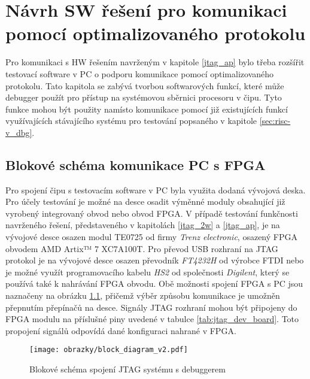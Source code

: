 \chapter{Návrh SW řešení pro komunikaci pomocí optimalizovaného protokolu}	\label{sw}
Pro komunikaci s HW řešením navrženým v kapitole \ref{jtag_ap} bylo třeba rozšířit testovací software v PC o podporu komunikace pomocí optimalizovaného protokolu. Tato kapitola se zabývá tvorbou softwarových funkcí, které může debugger použít pro přístup na systémovou sběrnici procesoru v čipu. Tyto funkce mohou být použity namísto komunikace pomocí již existujících funkcí využívajících stávajícího systému pro testování popsaného v kapitole \ref{sec:risc-v_dbg}.


\section{Blokové schéma komunikace PC s \acs{FPGA}}
Pro spojení čipu s testovacím software v PC byla využita dodaná vývojová deska. Pro účely testování je možné na desce osadit výměnné moduly obsahující již vyrobený integrovaný obvod nebo obvod \acs{FPGA}. V případě testování funkčnosti navrženého řešení, představeného v kapitolách \ref{jtag_2w} a \ref{jtag_ap}, je na vývojové desce osazen modul TE0725 od firmy \textit{Trenz electronic}, osazený FPGA obvodem AMD Artix™ 7 XC7A100T. Pro převod USB rozhraní na \acs{JTAG} protokol je na vývojové desce osazen převodník \textit{FT4232H} od výrobce FTDI nebo je možné využít programovacího kabelu \textit{HS2} od společnosti \textit{Digilent}, který se používá také k nahrávání \acs{FPGA} obvodu. Obě možnosti spojení \acs{FPGA} s PC jsou naznačeny na obrázku \ref{fig:block_diag}, přičemž výběr způsobu komunikace je umožněn přepnutím přepínačů na desce. Signály \acs{JTAG} rozhraní mohou být připojeny do FPGA modulu na příslušné piny uvedené v tabulce \ref{tab:jtag_dev_board}. Toto propojení signálů odpovídá dané konfiguraci nahrané v FPGA. \cite{TE0725_TRM}  \cite{TE0725_sch} \cite{FTDI4232H} \cite{HS2}

\begin{figure}[H]
  \begin{center}
    \texttt{[image: obrazky/block\_diagram\_v2.pdf]}
  \end{center}
  \caption{Blokové schéma spojení \acs{JTAG} systému s debuggerem}
	\label{fig:block_diag}
\end{figure}

